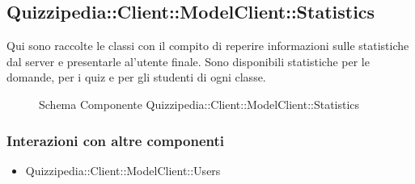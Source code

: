 \subsection{Quizzipedia::Client::ModelClient::Statistics}
Qui sono raccolte le classi con il compito di reperire informazioni sulle statistiche dal server e presentarle al'utente finale. Sono disponibili statistiche per le domande, per i quiz e per gli studenti di ogni classe.
\begin{figure}[H]
\centering
\noindent{}
\caption[Quizzipedia::Client::ModelClient::Statistics]{Schema Componente Quizzipedia::Client::ModelClient::Statistics}
\end{figure}
\subsubsection{Interazioni con altre componenti}
\begin{itemize}
\item Quizzipedia::Client::ModelClient::Users
\end{itemize}
